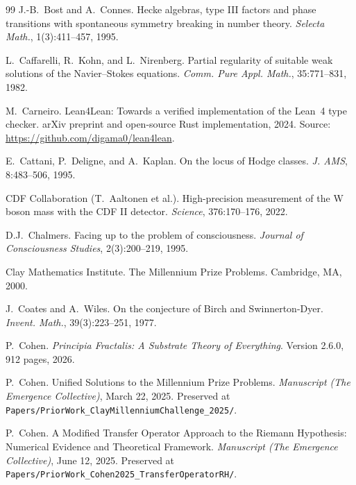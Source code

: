 \documentclass[11pt,a4paper]{amsart}
\theoremstyle{plain}
\theoremstyle{definition}
\begin{document}
\begin{thebibliography}{99}
J.-B.~Bost and A.~Connes.
\newblock Hecke algebras, type III factors and phase transitions with spontaneous symmetry breaking in number theory.
\newblock \emph{Selecta Math.}, 1(3):411--457, 1995.

L.~Caffarelli, R.~Kohn, and L.~Nirenberg.
\newblock Partial regularity of suitable weak solutions of the Navier--Stokes equations.
\newblock \emph{Comm. Pure Appl. Math.}, 35:771--831, 1982.

M.~Carneiro.
\newblock Lean4Lean: Towards a verified implementation of the Lean~4 type checker.
\newblock arXiv preprint and open-source Rust implementation, 2024. Source: \url{https://github.com/digama0/lean4lean}.

E.~Cattani, P.~Deligne, and A.~Kaplan.
\newblock On the locus of Hodge classes.
\newblock \emph{J. AMS}, 8:483--506, 1995.

CDF Collaboration (T.~Aaltonen et al.).
\newblock High-precision measurement of the W boson mass with the CDF II detector.
\newblock \emph{Science}, 376:170--176, 2022.

D.J.~Chalmers.
\newblock Facing up to the problem of consciousness.
\newblock \emph{Journal of Consciousness Studies}, 2(3):200--219, 1995.

Clay Mathematics Institute.
\newblock The Millennium Prize Problems.
\newblock Cambridge, MA, 2000.

J.~Coates and A.~Wiles.
\newblock On the conjecture of Birch and Swinnerton-Dyer.
\newblock \emph{Invent. Math.}, 39(3):223--251, 1977.

P.~Cohen.
\newblock \emph{Principia Fractalis: A Substrate Theory of Everything}.
\newblock Version 2.6.0, 912 pages, 2026.

P.~Cohen.
\newblock Unified Solutions to the Millennium Prize Problems.
\newblock \emph{Manuscript (The Emergence Collective)}, March 22, 2025. Preserved at \texttt{Papers/PriorWork\_ClayMillenniumChallenge\_2025/}.

P.~Cohen.
\newblock A Modified Transfer Operator Approach to the Riemann Hypothesis: Numerical Evidence and Theoretical Framework.
\newblock \emph{Manuscript (The Emergence Collective)}, June 12, 2025. Preserved at \texttt{Papers/PriorWork\_Cohen2025\_TransferOperatorRH/}.


\end{thebibliography}
\end{document}
